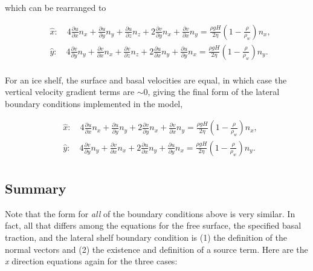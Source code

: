 which can be rearranged to

\begin{align*}
  & \hat{x}:\quad 4\frac{\partial u}{\partial x}n_{x}+\frac{\partial u}{\partial y}n_{y}+\frac{\partial u}{\partial z}n_{z}+2\frac{\partial v}{\partial y}n_{x}+\frac{\partial v}{\partial x}n_{y}=\frac{\rho gH}{2\eta }\left( 1-\frac{\rho }{\rho _{w}} \right)n_{x}, \\ 
 & \hat{y}:\quad 4\frac{\partial v}{\partial y}n_{y}+\frac{\partial v}{\partial x}n_{x}+\frac{\partial v}{\partial z}n_{z}+2\frac{\partial u}{\partial x}n_{y}+\frac{\partial u}{\partial y}n_{x}=\frac{\rho gH}{2\eta }\left( 1-\frac{\rho }{\rho _{w}} \right)n_{y}. \\ 
\end{align*}

For an ice shelf, the surface and basal velocities are equal, in which case the vertical velocity gradient terms are $\sim{0}$, giving the final form of the lateral boundary conditions implemented in the model,

\begin{align*}
  & \hat{x}:\quad 4\frac{\partial u}{\partial x}n_{x}+\frac{\partial u}{\partial y}n_{y}+2\frac{\partial v}{\partial y}n_{x}+\frac{\partial v}{\partial x}n_{y}=\frac{\rho gH}{2\eta }\left( 1-\frac{\rho }{\rho _{w}} \right)n_{x}, \\ 
 & \hat{y}:\quad 4\frac{\partial v}{\partial y}n_{y}+\frac{\partial v}{\partial x}n_{x}+2\frac{\partial u}{\partial x}n_{y}+\frac{\partial u}{\partial y}n_{x}=\frac{\rho gH}{2\eta }\left( 1-\frac{\rho }{\rho _{w}} \right)n_{y}. \\ 
\end{align*}

\subsection{Summary}
Note that the form for \textit{all} of the boundary conditions above is very similar. In fact, all that differs among the equations for the free surface, the specified basal traction, and the lateral shelf boundary condition is (1) the definition of the normal vectors and (2) the existence and definition of a source term. Here are the \textit{x} direction equations again for the three cases:


